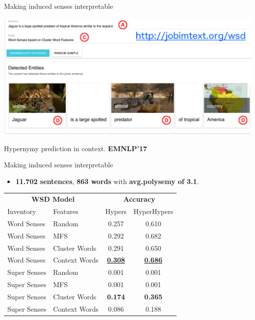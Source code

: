 \begin{frame}{ Making induced senses interpretable }

\vspace{-1em}
	\begin{center}
	\includegraphics[width=1.05\textwidth]{figures/emnlp_all}
	
	{\footnotesize Hypernymy prediction in context. \textbf{EMNLP'17}~\cite{panchenko-EtAl:2017:EMNLP2017Demos}}
	\end{center}	
	
	

	
\end{frame}



\begin{frame}{ Making induced senses interpretable }
	
	
\vspace{-1em}
	
\begin{itemize}
	\item \textbf{11.702 sentences}, \textbf{863 words} with \textbf{avg.polysemy of 3.1}.   
\end{itemize}  

\begin{center}
	
\begin{tabular}{llcc}

\multicolumn{2}{c}{\bf WSD Model} & \multicolumn{2}{c}{\bf Accuracy}  \\
Inventory & Features & Hypers &  HyperHypers  \\ \toprule

Word Senses & Random  & 0.257 & 0.610 \\
Word Senses & MFS  & 0.292 & 0.682 \\
Word Senses & Cluster Words & 0.291 & 0.650 \\
Word Senses & Context Words & \underline{\textbf{0.308}} & \underline{\textbf{0.686}} \\
\hline \pause
Super Senses & Random & 0.001 & 0.001 \\
Super Senses & MFS & 0.001 & 0.001 \\
Super Senses & Cluster Words & \textbf{0.174} & \textbf{0.365} \\
Super Senses & Context Words & 0.086 & 0.188 \\

\end{tabular}

\end{center}
	
\end{frame}

